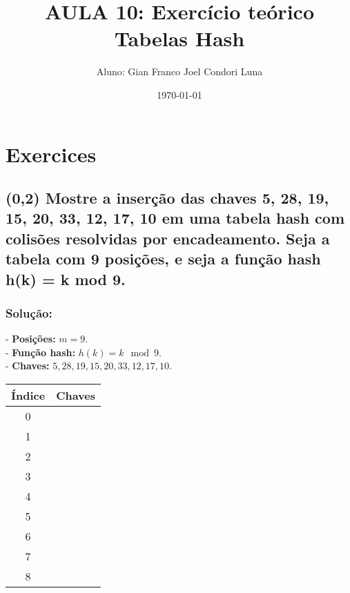 \documentclass{article}
\title{AULA 10: Exercício teórico Tabelas Hash}
\author{Aluno: Gian Franco Joel Condori Luna}
\date{\today}
\begin{document}
\maketitle

\section*{Exercices}
\setcounter{section}{1}
\subsection {(0,2) Mostre a inserção das chaves 5, 28, 19, 15, 20, 33, 12, 17, 10 em uma tabela hash
com colisões resolvidas por encadeamento. Seja a tabela com 9 posições, e seja a
função hash h(k) = k mod 9.}

\subsubsection{Solução:}

- \textbf{Posições:} \( m = 9 \).\\
- \textbf{Função hash:} \( h(k) = k \mod 9 \).\\
- \textbf{Chaves:} \(  5, 28, 19, 15, 20, 33, 12, 17, 10 \).

\begin{center}
\begin{tabular}{|c|c|}
\hline
\textbf{Índice} & \textbf{Chaves} \\
\hline
0 &  \\
1 &  \\
2 &  \\
3 &  \\
4 &  \\
5 &  \\
6 &  \\
7 &  \\
8 &  \\
\hline
\end{tabular}
\end{center}
\end{document}
